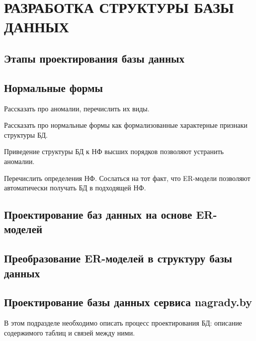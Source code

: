 \section[Разработка структуры БД]{РАЗРАБОТКА СТРУКТУРЫ БАЗЫ ДАННЫХ}

\subsection{Этапы проектирования базы данных}

\subsection{Нормальные формы}

Рассказать про аномалии, перечислить их виды.

Рассказать про нормальные формы как формализованные характерные 
признаки структуры БД.

Приведение структуры БД к НФ высших порядков позволяют устранить аномалии.

Перечислить определения НФ. Сослаться на тот факт, что ER-модели позволяют автоматически
получать БД в подходящей НФ.

\subsection{Проектирование баз данных на основе ER-моделей}

\subsection{Преобразование ER-моделей в структуру базы данных}

\subsection{Проектирование базы данных сервиса nagrady.by}

В этом подразделе необходимо описать процесс проектирования БД:
описание содержимого таблиц и связей между ними.